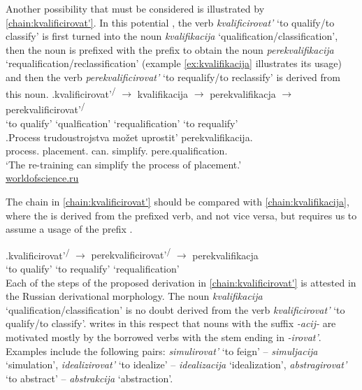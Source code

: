 Another possibility that must be considered is illustrated by \ref{chain:kvalificirovat'}. In this potential , the verb \textit{kvalificirovat'} `to qualify/to classify' is first turned into the noun \textit{kvalifikacija} `qualification\slash classification', then the noun is prefixed with the prefix  to obtain the noun \textit{perekvalifikacija}  `requalification/reclassification' (example \ref{ex:kvalifikacija} illustrates its usage) and then the verb \textit{perekvalificirovat'} `to requalify/to reclassify' is derived from this noun. 
\exg.\label{chain:kvalificirovat'}kvalificirovat'\textsuperscript{\PF\slash\IPF} {$\rightarrow$} kvalifikacija {$\rightarrow$} perekvalifikacja {$\rightarrow$} {perekvalificirovat'\textsuperscript{\PF\slash\IPF}}\\
{`to qualify'} {} {`qualfication'} {} {`requalification'} {} {`to requalify'}\\

\exg.\label{ex:kvalifikacija}Process trudoustrojstva mo\v{z}et uprostit' perekvalifikacija.\\
process. placement. can. simplify. pere.qualification.\\
\trans `The re-training can simplify the process of placement.'\\\hbox{}\hfill\hbox{\url{worldofscience.ru}}

The chain in \ref{chain:kvalificirovat'} should be compared with \ref{chain:kvalifikacija}, where the  is derived from the prefixed verb, and not vice versa, but requires us to assume a  usage of the prefix .

\exg.\label{chain:kvalifikacija}kvalificirovat'\textsuperscript{\PF\slash\IPF} {$\rightarrow$} {perekvalificirovat'\textsuperscript{\PF\slash\IPF}} {$\rightarrow$} perekvalifikacja\\
{`to qualify'} {} {`to requalify'} {} {`requalification'}\\

Each of the steps of the proposed derivation in \ref{chain:kvalificirovat'} is attested in the Russian derivational morphology. The noun \textit{kvalifikacija} `qualification\slash classification' is no doubt derived from the verb \textit{kvalificirovat'} `to qualify/to classify'. \citet{Shvedova:82} writes in this respect that nouns with the suffix \textit{-acij-} are motivated mostly by the borrowed verbs with the stem ending in \textit{-irovat'}. Examples \citep[taken from][159]{Shvedova:82} include the following pairs: \textit{simulirovat'} `to feign' -- \textit{simuljacija} `simulation', \textit{idealizirovat'} `to idealize'  -- \textit{idealizacija} `idealization', \textit{abstragirovat'} `to abstract' -- \textit{abstrakcija} `abstraction'.

